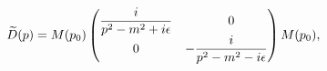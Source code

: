 \begin{equation}
\label{eq:matrix_prop}
  \widetilde{\!D}(p)=M(p_0)\left(\begin{matrix}
     \dfrac{i}{p^2-m^2+i\epsilon}&\hphantom{-}0\\
     0&-\dfrac{i}{p^2-m^2-i\epsilon}\end{matrix}\right)M(p_0),
\end{equation}

